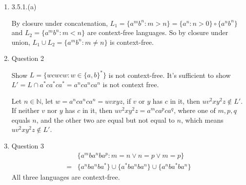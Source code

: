 \documentclass[10pt,a4paper]{article}
\begin{document}
\begin{enumerate}
	\item 3.5.1.(a) \par
	By closure under concatenation, $L_1=\{a^mb^n:m>n\}=\{a^n:n>0\}\circ\{a^nb^n\}$ and $L_2=\{a^mb^n:m<n\}$ are context-free languages. So by closure under union, $L_1\cup L_2=\{a^mb^n:m\ne n\}$ is context-free. 
	\item Question 2 \par
	Show $L=\{wcwcw:w\in\{a,b\}^*\}$ is not context-free. It's sufficient to show $L'=L\cap a^*ca^*ca^*=a^nca^nca^n$ is not context free. \par
	Let $n\in\mathbb{N}$, let $w=a^nca^nca^n=uvxyz$, if $v$ or $y$ has $c$ in it, then $uv^2xy^2z\notin L'$. If neither $v$ nor $y$ has $c$ in it, then $uv^2xy^2z=a^mca^pca^q$, where one of $m,p,q$ equals $n$, and the other two are equal but not equal to $n$, which means $uv^2xy^2z\notin L'$.
	\item Question 3
	\begin{align*}
	  & \{a^mba^nba^ p: m = n \lor n = p \lor m = p\} \\
	= & \{a^nba^nba^*\}\cup \{a^*ba^nba^n\}\cup \{a^nba^*ba^n\}
	\end{align*}
	All three languages are context-free.
\end{enumerate}
\end{document}
